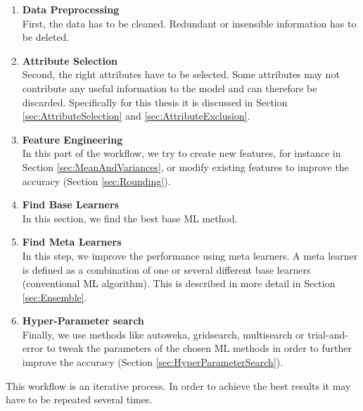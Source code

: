 

\begin{enumerate}
\item \textbf{Data Preprocessing} \\
First, the data has to be cleaned. Redundant or insensible information has to be deleted. 
\item \textbf{Attribute Selection} \\
Second, the right attributes have to be selected. Some attributes may not contribute any useful information to the model and can therefore be discarded. Specifically for this thesis it is discussed in Section \ref{sec:AttributeSelection} and \ref{sec:AttributeExclusion}.
\item \textbf{Feature Engineering} \\
In this part of the workflow, we try to create new features, for instance in Section \ref{sec:MeanAndVariances}, or modify existing features to improve the accuracy (Section \ref{sec:Rounding}).
\item \textbf{Find Base Learners} \\
In this section, we find the best base ML method.
\item \textbf{Find Meta Learners} \\
In this step, we improve the performance using meta learners. A meta learner is defined as a combination of one or several different base learners (conventional ML algorithm). This is described in more detail in Section \ref{sec:Ensemble}.
\item \textbf{Hyper-Parameter search} \\
Finally, we use methods like autoweka, gridsearch, multisearch or trial-and-error to tweak the parameters of the chosen ML methods in order to further improve the accuracy (Section \ref{sec:HyperParameterSearch}).
\end{enumerate}

This workflow is an iterative process. In order to achieve the best results it may have to be repeated several times.



